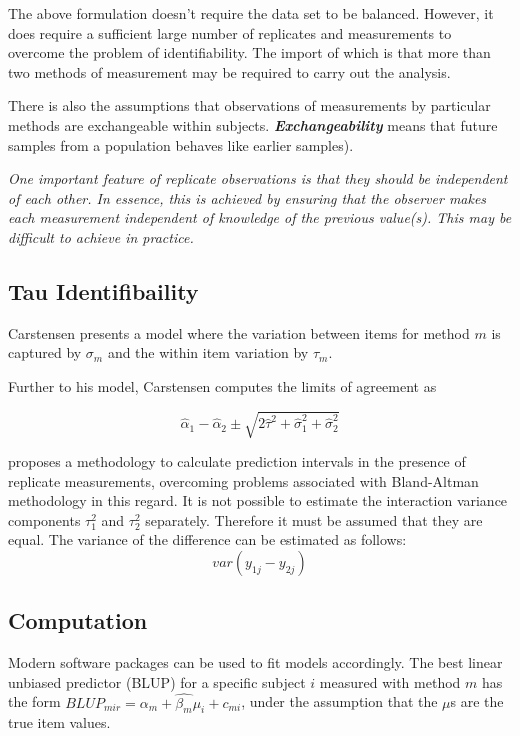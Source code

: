 \documentclass[12pt, a4paper]{report}
\theoremstyle{plain}
\theoremstyle{definition}
\theoremstyle{remark}
\begin{document}
	The above formulation doesn't require the data set to be balanced.
	However, it does require a sufficient large number of replicates
	and measurements to overcome the problem of identifiability. 
	The
	import of which is that more than two methods of measurement may
	be required to carry out the analysis. 
	
	There is also the
	assumptions that observations of measurements by particular
	methods are exchangeable within subjects.  \textbf{\textit{Exchangeability}} means
	that future samples from a population behaves like earlier
	samples).
	
	
	
	\emph{
		One important feature of replicate observations is that they should be independent
		of each other. In essence, this is achieved by ensuring that the observer makes each
		measurement independent of knowledge of the previous value(s). This may be difficult
		to achieve in practice.}
	
	
	\subsection{Tau Identifibaility}
	
	Carstensen presents a model where the variation between items for
	method $m$ is captured by $\sigma_m$ and the within item variation
	by $\tau_m$.
	
	Further to his model, Carstensen computes the limits of agreement
	as
	
	\[
	\hat{\alpha}_1 - \hat{\alpha}_2 \pm \sqrt{2 \hat{\tau}^2 +
		\hat{\sigma}^2_1 + \hat{\sigma}^2_2}
	\]
	
	
	\citet{BXC2008} proposes a methodology to calculate prediction
	intervals in the presence of replicate measurements, overcoming problems associated with Bland-Altman methodology in this regard.
	It is not possible to estimate the interaction variance components
	$\tau^{2}_{1}$ and $\tau^{2}_{2}$ separately. Therefore it must be
	assumed that they are equal. The variance of the difference can be
	estimated as follows:
	\begin{equation}
	var(y_{1j}-y_{2j})
	\end{equation}
	
	
	\subsection{Computation} Modern software
	packages can be used to fit models accordingly. The best linear
	unbiased predictor (BLUP) for a specific subject $i$ measured with
	method $m$ has the form $BLUP_{mir} = \hat{\alpha_{m}} +
	\hat{\beta_{m}}\mu_{i} + c_{mi}$, under the assumption that the
	$\mu$s are the true item values.
	
\end{document}
